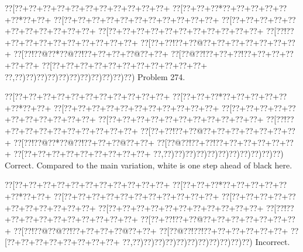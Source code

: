\documentclass[a5paper]{article}
\begin{document}
\newpage
\begin{center}
{\goo
\0??[\0??+\0??+\0??+\0??+\0??+\0??+\0??+\0??+\0??+\0??+\0??+
\0??[\0??+\0??+\0??*\0??+\0??+\0??+\0??+\0??+\0??*\0??+\0??+
\0??[\0??+\0??+\0??+\0??+\0??+\0??+\0??+\0??+\0??+\0??+\0??+
\0??[\0??+\0??+\0??+\0??+\0??+\0??+\0??+\0??+\0??+\0??+\0??+
\0??[\0??+\0??+\0??+\0??+\0??+\0??+\0??+\0??+\0??+\0??+\0??+
\0??[\0??!\0??+\0??+\0??+\0??+\0??+\0??+\0??+\0??+\0??+\0??+
\0??[\0??+\0??!\0??+\0??@\0??+\0??+\0??+\0??+\0??+\0??+\0??+
\0??[\0??!\0??@\0??*\0??@\0??!\0??+\0??+\0??+\0??@\0??+\0??+
\0??[\0??@\0??!\0??+\0??+\0??!\0??+\0??+\0??+\0??+\0??+\0??+
\0??[\0??+\0??+\0??+\0??+\0??+\0??+\0??+\0??+\0??+\0??+\0??+
\0??,\0??)\0??)\0??)\0??)\0??)\0??)\0??)\0??)\0??)\0??)\0??)
}
Problem 274.

\end{center}
\begin{center}
{\goo
\0??[\0??+\0??+\0??+\0??+\0??+\0??+\0??+\0??+\0??+\0??+\0??+
\0??[\0??+\0??+\0??*\0??+\0??+\0??+\0??+\0??+\0??*\0??+\0??+
\0??[\0??+\0??+\0??+\0??+\0??+\0??+\0??+\0??+\0??+\0??+\0??+
\0??[\0??+\0??+\0??+\0??+\0??+\0??+\0??+\0??+\0??+\0??+\0??+
\0??[\0??+\0??+\0??+\0??+\0??+\0??+\0??+\0??+\0??+\0??+\0??+
\0??[\0??!\0??+\0??+\0??+\0??+\0??+\0??+\0??+\0??+\0??+\0??+
\0??[\0??+\0??!\0??+\0??@\0??+\0??+\0??+\0??+\0??+\0??+\0??+
\0??[\0??!\0??@\0??*\0??@\0??!\0??+\0??+\0??@\0??+\0??+
\0??[\0??@\0??!\0??+\0??!\0??+\0??+\0??+\0??+\0??+\0??+
\0??[\0??+\0??+\0??+\0??+\0??+\0??+\0??+\0??+\0??+
\0??,\0??)\0??)\0??)\0??)\0??)\0??)\0??)\0??)\0??)\0??)\0??)
}
Correct. Compared to the main variation, white is one step ahead of black here.

\end{center}
\begin{center}
{\goo
\0??[\0??+\0??+\0??+\0??+\0??+\0??+\0??+\0??+\0??+\0??+\0??+
\0??[\0??+\0??+\0??*\0??+\0??+\0??+\0??+\0??+\0??*\0??+\0??+
\0??[\0??+\0??+\0??+\0??+\0??+\0??+\0??+\0??+\0??+\0??+\0??+
\0??[\0??+\0??+\0??+\0??+\0??+\0??+\0??+\0??+\0??+\0??+\0??+
\0??[\0??+\0??+\0??+\0??+\0??+\0??+\0??+\0??+\0??+\0??+\0??+
\0??[\0??!\0??+\0??+\0??+\0??+\0??+\0??+\0??+\0??+\0??+\0??+
\0??[\0??+\0??!\0??+\0??@\0??+\0??+\0??+\0??+\0??+\0??+\0??+
\0??[\0??!\0??@\0??@\0??!\0??+\0??+\0??+\0??@\0??+\0??+
\0??[\0??@\0??!\0??!\0??+\0??+\0??+\0??+\0??+\0??+
\0??[\0??+\0??+\0??+\0??+\0??+\0??+\0??+\0??+
\0??,\0??)\0??)\0??)\0??)\0??)\0??)\0??)\0??)\0??)\0??)\0??)
}
Incorrect. 

\end{center}
\end{document}
